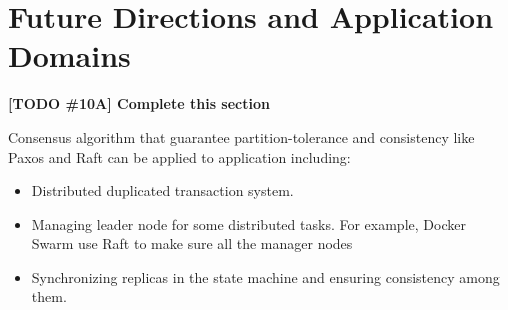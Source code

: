 \documentclass[12pt, a4paper]{article}
\newcommand{\todo}[2]{\textbf{\color{blue}[TODO \##1] #2}\par}
\begin{document}
\section{Future Directions and Application Domains}

\todo{10A}{Complete this section}

Consensus algorithm that guarantee partition-tolerance and consistency like Paxos and Raft can be applied to application including:
\begin{itemize}
    \item Distributed duplicated transaction system.
    \item Managing leader node for some distributed tasks. For example, Docker Swarm use Raft to make sure all the manager nodes
    \item Synchronizing replicas in the state machine and ensuring consistency among them.
\end{itemize}



\end{document}
